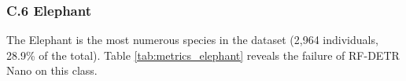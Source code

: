 \begin{table}[ht]
\centering
\caption{Performance metrics for the Waterbuck species (Phase 2).}
\label{tab:metrics_waterbuck}
\end{table}

\subsubsection*{C.6 Elephant}

The Elephant is the most numerous species in the dataset (2,964 individuals, 28.9\% of the total). Table \ref{tab:metrics_elephant} reveals the failure of RF-DETR Nano on this class.

